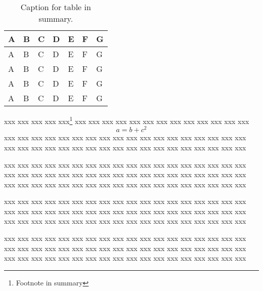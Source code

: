 \documentclass[10pt,twoside%
	]{article}
\begin{document}
\begin{table}[ht]
\caption{Caption for table in summary.}
\label{t:stbl}
\begin{tabular}{l|l|l|l|l|l|l}
A&B&C&D&E&F&G\\
\hline
A&B&C&D&E&F&G\\
\hline
A&B&C&D&E&F&G\\
\hline
A&B&C&D&E&F&G\\
\hline
A&B&C&D&E&F&G\\
\end{tabular}
\end{table}

xxx xxx xxx xxx xxx\footnote
{Footnote in summary}
 xxx xxx xxx xxx xxx xxx xxx xxx xxx xxx xxx xxx xxx 
%
\begin{equation}
a = b + c^2
\end{equation}
%
xxx xxx xxx xxx xxx xxx xxx xxx xxx xxx xxx xxx xxx xxx xxx xxx xxx xxx 
xxx xxx xxx xxx xxx xxx xxx xxx xxx xxx xxx xxx xxx xxx xxx xxx xxx xxx 

xxx xxx xxx xxx xxx xxx xxx xxx xxx xxx xxx xxx xxx xxx xxx xxx xxx xxx 
xxx xxx xxx xxx xxx xxx xxx xxx xxx xxx xxx xxx xxx xxx xxx xxx xxx xxx 
xxx xxx xxx xxx xxx xxx xxx xxx xxx xxx xxx xxx xxx xxx xxx xxx xxx xxx 

xxx xxx xxx xxx xxx xxx xxx xxx xxx xxx xxx xxx xxx xxx xxx xxx xxx xxx 
xxx xxx xxx xxx xxx xxx xxx xxx xxx xxx xxx xxx xxx xxx xxx xxx xxx xxx 
xxx xxx xxx xxx xxx xxx xxx xxx xxx xxx xxx xxx xxx xxx xxx xxx xxx xxx 

xxx xxx xxx xxx xxx xxx xxx xxx xxx xxx xxx xxx xxx xxx xxx xxx xxx xxx 
xxx xxx xxx xxx xxx xxx xxx xxx xxx xxx xxx xxx xxx xxx xxx xxx xxx xxx 
xxx xxx xxx xxx xxx xxx xxx xxx xxx xxx xxx xxx xxx xxx xxx xxx xxx xxx 
\end{document}
